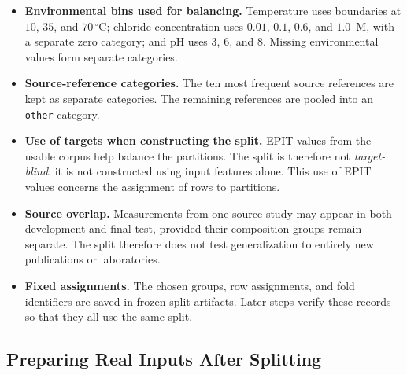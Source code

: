\documentclass[11pt]{article}
\newenvironment{notes}
  {\begin{itemize}\setlength{\itemsep}{0.45em}\setlength{\parsep}{0pt}}
  {\end{itemize}}
\begin{document}
\begin{notes}
    \item \textbf{Environmental bins used for balancing.}
    Temperature uses boundaries at \(10\), \(35\), and
    \(70\,^{\circ}\mathrm{C}\); chloride concentration uses
    \(0.01\), \(0.1\), \(0.6\), and \(1.0\)~M, with a separate zero
    category; and pH uses \(3\), \(6\), and \(8\).
    Missing environmental values form separate categories.

    \item \textbf{Source-reference categories.} The ten most frequent
    source references are kept as separate categories. The remaining
    references are pooled into an \texttt{other} category.

    \item \textbf{Use of targets when constructing the split.}
    EPIT values from the usable corpus help balance the partitions.
    The split is therefore not \emph{target-blind}: it is not
    constructed using input features alone. This use of EPIT values
    concerns the assignment of rows to partitions.

    \item \textbf{Source overlap.} Measurements from one source study
    may appear in both development and final test, provided their
    composition groups remain separate. The split therefore does not
    test generalization to entirely new publications or laboratories.

    \item \textbf{Fixed assignments.} The chosen groups, row
    assignments, and fold identifiers are saved in frozen split
    artifacts. Later steps verify these records so that they all use
    the same split.
\end{notes}

\subsection{Preparing Real Inputs After Splitting}
\label{sec:real-data-representation}
\end{document}
